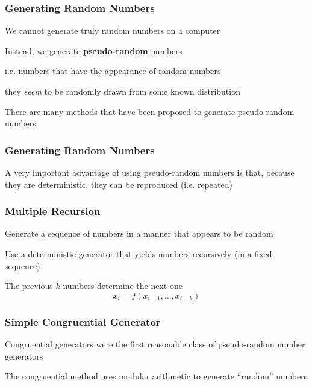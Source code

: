 \documentclass[12pt]{beamer}\usepackage[]{graphicx}\usepackage[]{color}
\begin{document}

\begin{frame}
\frametitle{Generating Random Numbers}

\bbi
  \item We cannot generate truly random numbers on a computer
  \item Instead, we generate \textbf{pseudo-random} numbers
  \item i.e. numbers that have the appearance of random numbers
  \item they \textit{seem} to be randomly drawn from some known distribution
  \item There are many methods that have been proposed to generate pseudo-random numbers
\ei

\end{frame}


\begin{frame}
\frametitle{Generating Random Numbers}

\Large A very important advantage of using pseudo-random numbers is that, because they are deterministic, they can be reproduced (i.e. repeated)

\end{frame}


\begin{frame}[fragile]
\frametitle{Multiple Recursion}

\bbi
  \item Generate a sequence of numbers in a manner that appears to be random
  \item Use a deterministic generator that yields numbers recursively (in a fixed sequence)
  \item The previous $k$ numbers determine the next one
\ei
$$
x_i = f(x_{i-1}, \dots, x_{i-k})
$$

\end{frame}


\begin{frame}
\frametitle{Simple Congruential Generator}

\bi
  \item Congruential generators were the first reasonable class of pseudo-random number generators
  \item The congruential method uses modular arithmetic to generate ``random'' numbers
\ei

\end{frame}
\end{document}
